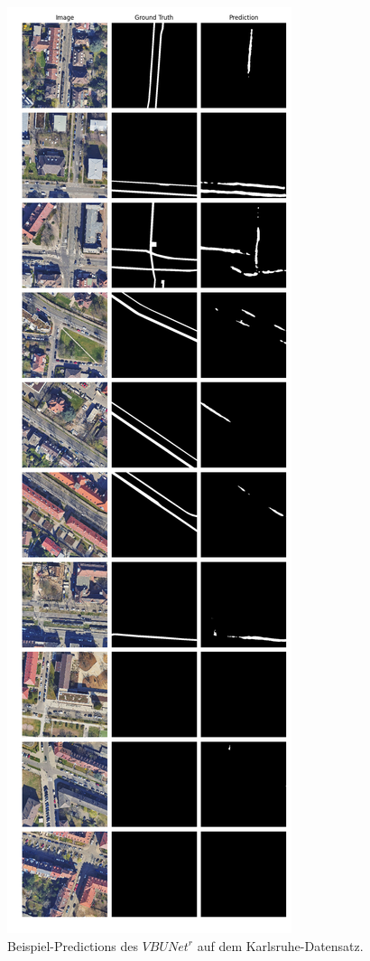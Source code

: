 \begin{figure}
	\centering
	\includegraphics[width=.41\textwidth]{Bilder/Samples-KA/vbunet-r.png} 
	\caption{Beispiel-Predictions des $VBUNet^r$ auf dem Karlsruhe-Datensatz.}
	\label{fig:ka-samples-vbunet-r}
\end{figure}

